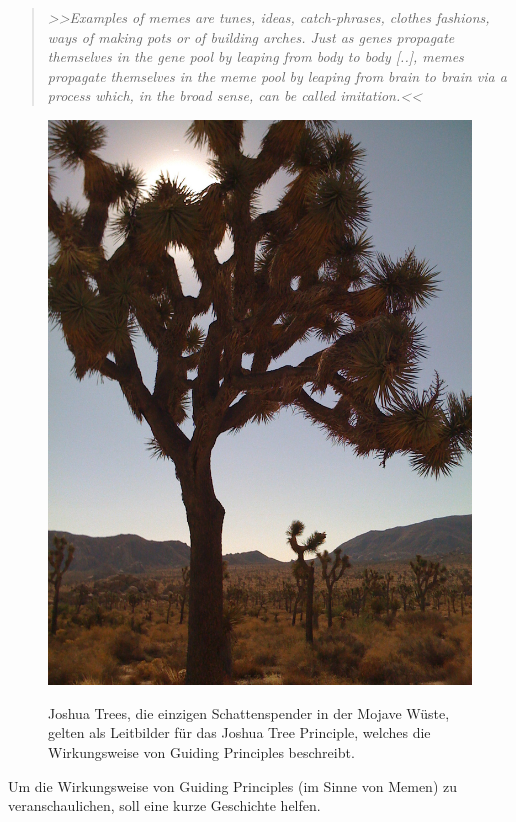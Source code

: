 \begin{quote} \slshape
>>Examples of memes are tunes, ideas, catch-phrases, clothes fashions, ways of making pots or of building arches. Just as genes propagate themselves in the gene pool by leaping from body to body [..], memes propagate themselves in the meme pool by leaping from brain to brain via a process which, in the broad sense, can be called imitation.<<
\begin{flushright}\citep{Dawkins:1989}\end{flushright}
\end{quote}

\begin{figure}
	\begin{center}
        {\includegraphics[width=.5\linewidth]{gfx/sagmeisterJoshuaTrees}}
	\end{center}
		\caption[Joshua Trees \newline \citep{Sagmeister:2008}]{Joshua Trees, die einzigen Schattenspender in der Mojave Wüste, gelten als Leitbilder für das Joshua Tree Principle, welches die Wirkungsweise von Guiding Principles beschreibt.}\label{fig:sagmeisterJoshuaTrees}
\end{figure}

Um die Wirkungsweise von Guiding Principles (im Sinne von Memen) zu veranschaulichen, soll eine kurze Geschichte helfen. 

